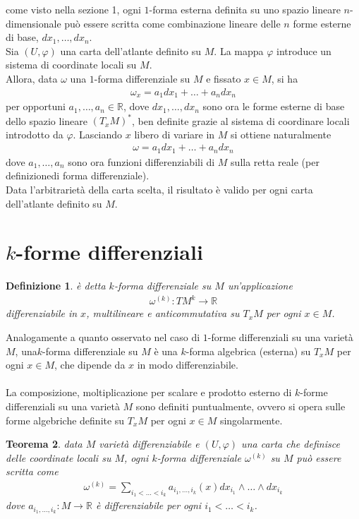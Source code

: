\documentclass[twoside, 11pt]{amsbook}
\makeatletter
\newcommand{\0}{{(0)}}
\newcommand{\3}{{(3)}}
\theoremstyle{colonplain}
\newtheorem{thm}{Teorema}[chapter]
\theoremstyle{colondefinition}
\newtheorem{defn}[thm]{Definizione}
\theoremstyle{colonremark}
\numberwithin{equation}{chapter}
\renewcommand{\proofname}{Dimostrazione}
\renewenvironment{proof}[1][\proofname]{\par
  \pushQED{\qed}%
  \normalfont \topsep6\p@\@plus6\p@\relax
  \trivlist
  \item[\hskip\labelsep\bfseries #1:]\ignorespaces
}{%
  \popQED\endtrivlist\@endpefalse
}
\makeatother
\begin{document}
\begin{proof} come visto nella sezione 1, ogni $1$-forma esterna definita su uno spazio lineare $n$-dimensionale può essere scritta come combinazione lineare delle $n$ forme esterne di base, $dx_1, \dots, dx_n$. \\
Sia $(U, \varphi)$ una carta dell'atlante definito su $M$. La mappa $\varphi$ introduce un sistema di coordinate locali su $M$. \\
Allora, data $\omega$ una $1$-forma differenziale su $M$ e fissato $x \in M$, si ha 
\begin{align}
    \omega_x = a_1dx_1 + \dots + a_ndx_n
\end{align}
per opportuni $a_1, \dots, a_n \in \mathbb{R}$, dove $dx_1, \dots, dx_n$ sono ora le forme esterne di base dello spazio lineare $(T_xM)^*$, ben definite grazie al sistema di coordinare locali introdotto da $\varphi$. Lasciando $x$ libero di variare in $M$ si ottiene naturalmente 
\begin{align}
   \omega = a_1dx_1 + \dots + a_ndx_n
\end{align}
dove $a_1, \dots, a_n$ sono ora funzioni differenziabili di $M$ sulla retta reale (per definizionedi forma differenziale). \\
Data l'arbitrarietà della carta scelta, il risultato è valido per ogni carta dell'atlante definito su $M$. \end{proof}

\section{$k$-forme differenziali}
\begin{defn} è detta $k$-\textit{forma differenziale} su $M$ un'applicazione 
\begin{align}
   \omega^{(k)} : TM^k \longrightarrow \mathbb{R} 
\end{align}
differenziabile in $x$, multilineare e anticommutativa su $T_xM$ per ogni $x \in M$.
\end{defn}
Analogamente a quanto osservato nel caso di $1$-forme differenziali su una varietà $M$, una$k$-forma differenziale su $M$ è una $k$-forma algebrica (esterna) su $T_xM$ per ogni $x \in M$, che dipende da $x$ in modo differenziabile. \\ \\
La composizione, moltiplicazione per scalare e prodotto esterno di $k$-forme differenziali su una varietà $M$ sono definiti puntualmente, ovvero si opera sulle forme algebriche definite su $T_xM$ per ogni $x \in M$ singolarmente.
\begin{thm} data $M$ varietà differenziabile e $(U, \varphi)$ una carta che definisce delle coordinate locali su $M$, ogni $k$-forma differenziale $\omega^{(k)}$ su $M$ può essere scritta come
\begin{align}
   \omega^{(k)} = \sum_{i_1 < \dots < i_k} a_{i_1, \dots, i_k}(x)dx_{i_1} \wedge \dots \wedge dx_{i_k} 
\end{align}
dove $a_{i_1, \dots, i_k} : M \longrightarrow \mathbb{R}$ è differenziabile per ogni $i_1 < \dots <i_k$.
\end{thm}
\end{document}
